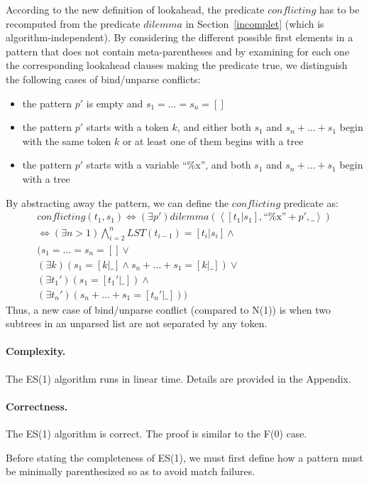 \documentclass{sigplanconf}
\begin{document}
According to the new definition of lookahead, the predicate
$conflicting$ has to be recomputed from the predicate $dilemma$ in
Section~\ref{incomplet} (which is algorithm-independent). By
considering the different possible first elements in a pattern that
does not contain meta-parentheses and by examining for each one the
corresponding lookahead clauses making the predicate true, we
distinguish the following cases of bind/unparse conflicts:
\begin{itemize}
\item the pattern $p'$ is empty and $s_1=\dots=s_n=[]$
\item the pattern $p'$ starts with a token $k$, and either both $s_1$ and
$s_n+\dots+s_1$ begin with the same token $k$ or at least one of them
begins with a tree
\item the pattern $p'$ starts with a variable ``\%x'', and both $s_1$ and
$s_n+\dots+s_1$ begin with a tree
\end{itemize}

By abstracting away the pattern, we can define the $conflicting$
predicate as:
\begin{eqnarray*}
conflicting(t_1, s_1) \iff 
 (\exists p') dilemma(\left<[t_1 | s_1], \mbox{``\%x''}+p', \_\right>) \\
 \iff (\exists n>1) \bigwedge_{i=2}^{n} LST(t_{i-1}) = [t_i | s_i] \land \\
 (s_1=\dots=s_n=[] \lor \\
  (\exists k)(s_1 = [k | \_] \land s_n+\dots+s_1 = [k | \_]) \lor \\
  (\exists t_1')(s_1=[t_1'|\_]) \land \\
  (\exists t_n')(s_n+\dots+s_1=[t_n'|\_]))
\end{eqnarray*}
Thus, a new case of bind/unparse conflict (compared to N(1)) is when
two subtrees in an unparsed list are not separated by any token.


\paragraph{Complexity.}
The ES(1) algorithm runs in linear time. Details are provided in the
Appendix.

\paragraph{Correctness.} The ES(1) algorithm is correct. The proof is
similar to the F(0) case.

Before stating the completeness of ES(1), we must first define how a
pattern must be minimally parenthesized so as to avoid match failures.
\end{document}
